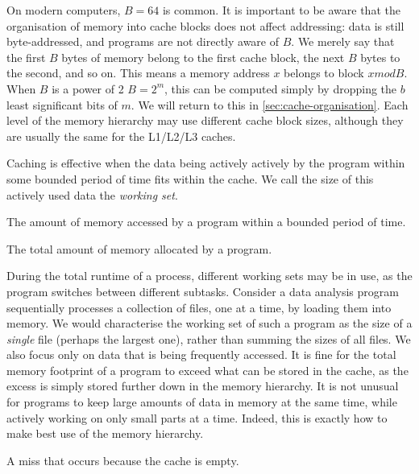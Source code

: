 On modern computers, $B=64$ is common.  It is important to be aware
that the organisation of memory into cache blocks does not affect
addressing: data is still byte-addressed, and programs are not
directly aware of $B$.  We merely say that the first $B$ bytes of
memory belong to the first cache block, the next $B$ bytes to the
second, and so on.  This means a memory address $x$ belongs to block
$x mod B$.  When $B$ is a power of 2 $B=2^{m}$, this can be computed
simply by dropping the $b$ least significant bits of $m$.  We will
return to this in \cref{sec:cache-organisation}.  Each level of the
memory hierarchy may use different cache block sizes, although they
are usually the same for the L1/L2/L3 caches.

Caching is effective when the data being actively actively by the
program within some bounded period of time fits within the cache.  We
call the size of this actively used data the \emph{working set}.

\begin{definition}
  The amount of memory accessed by a program within a bounded period
  of time.
\end{definition}

\begin{definition}
  The total amount of memory allocated by a program.
\end{definition}

During the total runtime of a process, different working sets may be
in use, as the program switches between different subtasks.  Consider
a data analysis program sequentially processes a collection of files,
one at a time, by loading them into memory.  We would characterise the
working set of such a program as the size of a \emph{single} file
(perhaps the largest one), rather than summing the sizes of all files.
We also focus only on data that is being frequently accessed.  It is
fine for the total memory footprint of a program to exceed what can be
stored in the cache, as the excess is simply stored further down in
the memory hierarchy.  It is not unusual for programs to keep large
amounts of data in memory at the same time, while actively working on
only small parts at a time.  Indeed, this is exactly how to make best
use of the memory hierarchy.

\begin{definition}
  A miss that occurs because the cache is empty.
\end{definition}

